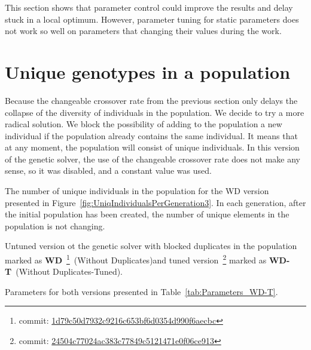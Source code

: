 This section shows that parameter control could improve the results and delay stuck in a local optimum. However, parameter tuning for static parameters does not work so well on parameters that changing their values during the work.                     

\section{Unique genotypes in a population}
\label{sec:WD}

Because the changeable crossover rate from the previous section only delays the collapse of the diversity of individuals in the population. We decide to try a more radical solution. We block the possibility of adding to the population a new individual if the population already contains the same individual. It means that at any moment, the population will consist of unique individuals. In this version of the genetic solver, the use of the changeable crossover rate does not make any sense, so it was disabled, and a constant value was used.

The number of unique individuals in the population for the WD version presented in Figure~\ref{fig:UniqIndividualsPerGeneration3}. In each generation, after the initial population has been created, the number of unique elements in the population is not changing.

Untuned version ot the genetic solver with blocked duplicates in the population marked as  \textbf{WD}~\footnote{commit: \href{https://git-st.inf.tu-dresden.de/mquat/mquat2/commit/1d79c50d7932c9216c653bf6d0354d990f6aecbc}{1d79c50d7932c9216c653bf6d0354d990f6aecbc}}~(Without Duplicates)and tuned version~\footnote{commit: \href{https://git-st.inf.tu-dresden.de/mquat/mquat2/commit/24504c77024ac383c77849c5121471e0f06ce913}{24504c77024ac383c77849c5121471e0f06ce913}} marked as \textbf{WD-T}~(Without Duplicates-Tuned).

Parameters for both versions presented in Table~\ref{tab:Parameters_WD-T}.


